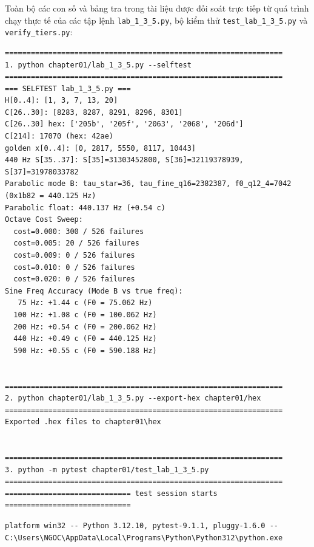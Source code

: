 \documentclass[11pt,a4paper]{article}
\begin{document}
Toàn bộ các con số và bảng tra trong tài liệu được đối soát trực tiếp từ quá trình chạy thực tế của các tập lệnh \texttt{lab\_1\_3\_5.py}, bộ kiểm thử \texttt{test\_lab\_1\_3\_5.py} và \texttt{verify\_tiers.py}:

\begin{scriptsize}
\begin{verbatim}
================================================================
1. python chapter01/lab_1_3_5.py --selftest
================================================================
=== SELFTEST lab_1_3_5.py ===
H[0..4]: [1, 3, 7, 13, 20]
C[26..30]: [8283, 8287, 8291, 8296, 8301]
C[26..30] hex: ['205b', '205f', '2063', '2068', '206d']
C[214]: 17070 (hex: 42ae)
golden x[0..4]: [0, 2817, 5550, 8117, 10443]
440 Hz S[35..37]: S[35]=31303452800, S[36]=32119378939, S[37]=31978033782
Parabolic mode B: tau_star=36, tau_fine_q16=2382387, f0_q12_4=7042 (0x1b82 = 440.125 Hz)
Parabolic float: 440.137 Hz (+0.54 c)
Octave Cost Sweep:
  cost=0.000: 300 / 526 failures
  cost=0.005: 20 / 526 failures
  cost=0.009: 0 / 526 failures
  cost=0.010: 0 / 526 failures
  cost=0.020: 0 / 526 failures
Sine Freq Accuracy (Mode B vs true freq):
   75 Hz: +1.44 c (F0 = 75.062 Hz)
  100 Hz: +1.08 c (F0 = 100.062 Hz)
  200 Hz: +0.54 c (F0 = 200.062 Hz)
  440 Hz: +0.49 c (F0 = 440.125 Hz)
  590 Hz: +0.55 c (F0 = 590.188 Hz)


================================================================
2. python chapter01/lab_1_3_5.py --export-hex chapter01/hex
================================================================
Exported .hex files to chapter01\hex


================================================================
3. python -m pytest chapter01/test_lab_1_3_5.py
================================================================
============================= test session starts =============================
\end{verbatim}
\end{scriptsize}
{\tiny
\begin{verbatim}
platform win32 -- Python 3.12.10, pytest-9.1.1, pluggy-1.6.0 -- C:\Users\NGOC\AppData\Local\Programs\Python\Python312\python.exe
\end{verbatim}
}
\end{document}
